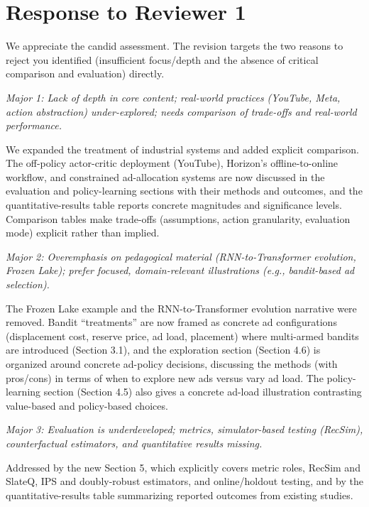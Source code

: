 \documentclass[11pt]{article}
\newenvironment{revcomment}
  {\par\smallskip\noindent\begin{list}{}{%
      \setlength{\leftmargin}{1.5em}\setlength{\rightmargin}{1em}}%
   \item\itshape\color{black!75}}
  {\end{list}\par\smallskip}
\begin{document}
\section*{Response to Reviewer 1}

We appreciate the candid assessment. The revision targets the two reasons to
reject you identified (insufficient focus/depth and the absence of critical
comparison and evaluation) directly.

\begin{revcomment}
Major 1: Lack of depth in core content; real-world practices (YouTube, Meta,
action abstraction) under-explored; needs comparison of trade-offs and
real-world performance.
\end{revcomment}

We expanded the treatment of industrial systems and added explicit comparison.
The off-policy actor-critic deployment (YouTube), Horizon's offline-to-online
workflow, and constrained ad-allocation systems are now discussed in the
evaluation and policy-learning sections with their methods and outcomes, and
the quantitative-results table reports concrete magnitudes and significance
levels. Comparison tables make trade-offs (assumptions, action granularity,
evaluation mode) explicit rather than implied.

\begin{revcomment}
Major 2: Overemphasis on pedagogical material (RNN-to-Transformer evolution,
Frozen Lake); prefer focused, domain-relevant illustrations (e.g., bandit-based
ad selection).
\end{revcomment}

The Frozen Lake example and the RNN-to-Transformer evolution narrative were
removed. Bandit ``treatments'' are now framed as concrete ad configurations
(displacement cost, reserve price, ad load, placement) where multi-armed
bandits are introduced (Section 3.1), and the exploration section (Section 4.6)
is organized around concrete ad-policy decisions, discussing the methods (with
pros/cons) in terms of when to explore new ads versus vary ad load. The
policy-learning section (Section 4.5) also gives a concrete ad-load
illustration contrasting value-based and policy-based choices.

\begin{revcomment}
Major 3: Evaluation is underdeveloped; metrics, simulator-based testing
(RecSim), counterfactual estimators, and quantitative results missing.
\end{revcomment}

Addressed by the new Section 5, which explicitly covers metric roles, RecSim
and SlateQ, IPS and doubly-robust estimators, and online/holdout testing, and
by the quantitative-results table summarizing reported outcomes from existing
studies.
\end{document}
